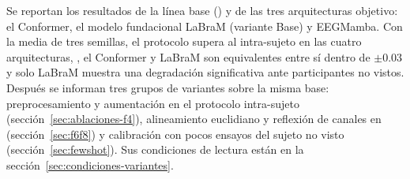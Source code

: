 \label{cap:resultados}

Se reportan los resultados de la línea base (\eegnet{}) y de las tres arquitecturas
objetivo: el Conformer, el modelo fundacional LaBraM (variante Base) y EEGMamba. Con la media
de tres semillas, el protocolo \loso{} supera al intra-sujeto en las cuatro arquitecturas,
\eegnet{}, el Conformer y LaBraM son equivalentes entre sí dentro de $\pm 0.03$ y solo LaBraM
muestra una degradación significativa ante participantes no vistos. Después se informan tres
grupos de variantes sobre la misma base: preprocesamiento y aumentación en el protocolo
intra-sujeto (sección~\ref{sec:ablaciones-f4}), alineamiento euclidiano y reflexión de canales
en \loso{} (sección~\ref{sec:f6f8}) y calibración con pocos ensayos del sujeto no visto
(sección~\ref{sec:fewshot}). Sus condiciones de lectura están en la
sección~\ref{sec:condiciones-variantes}.

